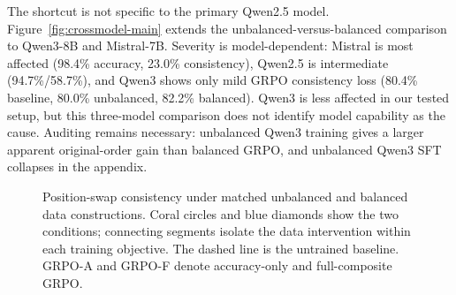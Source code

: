 \documentclass[letterpaper]{article}
\begin{document}
The shortcut is not specific to the primary Qwen2.5 model. Figure~\ref{fig:crossmodel-main} extends the unbalanced-versus-balanced comparison to Qwen3-8B and Mistral-7B. Severity is model-dependent: Mistral is most affected (98.4\% accuracy, 23.0\% consistency), Qwen2.5 is intermediate (94.7\%/58.7\%), and Qwen3 shows only mild GRPO consistency loss (80.4\% baseline, 80.0\% unbalanced, 82.2\% balanced). Qwen3 is less affected in our tested setup, but this three-model comparison does not identify model capability as the cause. Auditing remains necessary: unbalanced Qwen3 training gives a larger apparent original-order gain than balanced GRPO, and unbalanced Qwen3 SFT collapses in the appendix.

\begin{figure}[H]
\centering
{}
\caption{Position-swap consistency under matched unbalanced and balanced data constructions. Coral circles and blue diamonds show the two conditions; connecting segments isolate the data intervention within each training objective. The dashed line is the untrained baseline. GRPO-A and GRPO-F denote accuracy-only and full-composite GRPO.}
\label{fig:fix}
\end{figure}
\end{document}
